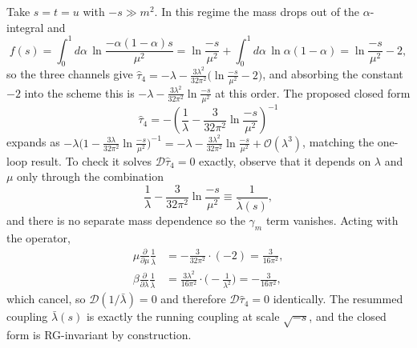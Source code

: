 \begin{solution}
 
Take $s = t = u$ with $-s \gg m^2$. In this regime the mass drops out of the $\alpha$-integral and
\begin{equation}
    f(s) = \int_0^1 d\alpha\,\ln\frac{-\alpha(1-\alpha)s}{\mu^2} = \ln\frac{-s}{\mu^2} + \int_0^1 d\alpha\,\ln\alpha(1-\alpha) = \ln\frac{-s}{\mu^2} - 2,
\end{equation}
so the three channels give $\hat\tau_4 = -\lambda - \frac{3\lambda^2}{32\pi^2}\big(\ln\frac{-s}{\mu^2} - 2\big)$, and absorbing the constant $-2$ into the scheme this is $-\lambda - \frac{3\lambda^2}{32\pi^2}\ln\frac{-s}{\mu^2}$ at this order. The proposed closed form
\begin{equation}
    \hat\tau_4 = -\left(\frac{1}{\lambda} - \frac{3}{32\pi^2}\ln\frac{-s}{\mu^2}\right)^{-1}
\end{equation}
expands as $-\lambda\big(1 - \frac{3\lambda}{32\pi^2}\ln\frac{-s}{\mu^2}\big)^{-1} = -\lambda - \frac{3\lambda^2}{32\pi^2}\ln\frac{-s}{\mu^2} + \mathcal{O}(\lambda^3)$, matching the one-loop result. To check it solves $\mathcal{D}\hat\tau_4 = 0$ exactly, observe that it depends on $\lambda$ and $\mu$ only through the combination
\begin{equation}
    \frac{1}{\lambda} - \frac{3}{32\pi^2}\ln\frac{-s}{\mu^2} \equiv \frac{1}{\bar\lambda(s)},
\end{equation}
and there is no separate mass dependence so the $\gamma_m$ term vanishes. Acting with the operator,
\begin{align}
    \mu\frac{\partial}{\partial\mu}\frac{1}{\bar\lambda} &= -\frac{3}{32\pi^2}\cdot(-2) = \frac{3}{16\pi^2}, \\
    \beta\frac{\partial}{\partial\lambda}\frac{1}{\bar\lambda} &= \frac{3\lambda^2}{16\pi^2}\cdot\Big(-\frac{1}{\lambda^2}\Big) = -\frac{3}{16\pi^2},
\end{align}
which cancel, so $\mathcal{D}(1/\bar\lambda) = 0$ and therefore $\mathcal{D}\hat\tau_4 = 0$ identically. The resummed coupling $\bar\lambda(s)$ is exactly the running coupling at scale $\sqrt{-s}$, and the closed form is RG-invariant by construction.
 

\end{solution}
